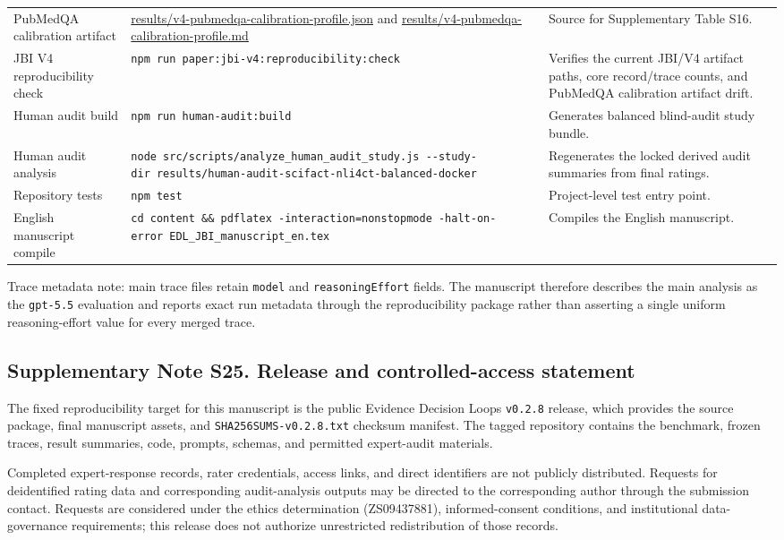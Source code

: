 \documentclass[
  8pt,
]{extarticle}
\begin{document}
\begin{center}
\begin{adjustbox}{max width=0.95\textwidth}
\begin{tabular}{@{}
lll@{}}
PubMedQA calibration artifact &
\url{results/v4-pubmedqa-calibration-profile.json} and
\url{results/v4-pubmedqa-calibration-profile.md} & Source for
Supplementary Table S16. \\
JBI V4 reproducibility check &
\texttt{npm\ run\ paper:jbi-v4:reproducibility:check} & Verifies the
current JBI/V4 artifact paths, core record/trace counts, and PubMedQA
calibration artifact drift. \\
Human audit build & \texttt{npm\ run\ human-audit:build} & Generates
balanced blind-audit study bundle. \\
Human audit analysis &
\texttt{node\ src/scripts/analyze\_human\_audit\_study.js\ -\/-study-dir\ results/human-audit-scifact-nli4ct-balanced-docker}
& Regenerates the locked derived audit summaries from final ratings. \\
Repository tests & \texttt{npm\ test} & Project-level test entry
point. \\
English manuscript compile &
\texttt{cd\ content\ \&\&\ pdflatex\ -interaction=nonstopmode\ -halt-on-error\ EDL\_JBI\_manuscript\_en.tex}
& Compiles the English manuscript. \\
\bottomrule
\end{tabular}
\end{adjustbox}
\end{center}

Trace metadata note: main trace files retain \texttt{model} and
\texttt{reasoningEffort} fields. The manuscript therefore describes the
main analysis as the \texttt{gpt-5.5} evaluation and reports exact run
metadata through the reproducibility package rather than asserting a
single uniform reasoning-effort value for every merged trace.

\hypertarget{supplementary-note-s25-release-and-controlled-access-statement}{%
\subsection{Supplementary Note S25. Release and controlled-access
statement}\label{supplementary-note-s25-release-and-controlled-access-statement}}

The fixed reproducibility target for this manuscript is the public
Evidence Decision Loops \texttt{v0.2.8} release, which provides the
source package, final manuscript assets, and
\texttt{SHA256SUMS-v0.2.8.txt} checksum manifest. The tagged repository
contains the benchmark, frozen traces, result summaries, code, prompts,
schemas, and permitted expert-audit materials.

Completed expert-response records, rater credentials, access links, and
direct identifiers are not publicly distributed. Requests for
deidentified rating data and corresponding audit-analysis outputs may be
directed to the corresponding author through the submission contact.
Requests are considered under the ethics determination (ZS09437881),
informed-consent conditions, and institutional data-governance
requirements; this release does not authorize unrestricted
redistribution of those records.
\end{document}
